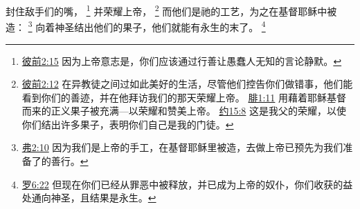 \documentclass[12pt, a4paper, oneside]{ctexart}
\begin{document}
	封住敌手们的嘴，
	\footnote {
		\href{https://biblehub.com/1_peter/2-15.htm}{彼前2:15} 因为上帝意志是，你们应该通过行善让愚蠢人无知的言论静默。
	}
	并荣耀上帝，
	\footnote {
		\href{https://biblehub.com/1_peter/2-12.htm}{彼前2:12} 在异教徒之间过如此美好的生活，尽管他们控告你们做错事，他们能看到你们的善迹，并在他拜访我们的那天荣耀上帝。
		\href{https://biblehub.com/philippians/1-11.htm}{腓1:11} 用藉着耶稣基督而来的正义果子被充满---以荣耀和赞美上帝。
		\href{https://biblehub.com/john/15-8.htm}{约15:8} 这是我父的荣耀，以使你们结出许多果子，表明你们自己是我的门徒。
	}
	而他们是祂的工艺，为之在基督耶稣中被造：
	\footnote {
		\href{https://biblehub.com/ephesians/2-10.htm}{弗2:10} 因为我们是上帝的手工，在基督耶稣里被造，去做上帝已预先为我们准备了的善行。
	}
	向着神圣结出他们的果子，他们就能有永生的末了。
	\footnote {
		\href{https://biblehub.com/romans/6-22.htm}{罗6:22} 但现在你们已经从罪恶中被释放，并已成为上帝的奴仆，你们收获的益处通向神圣，且结果是永生。
	}
\end{document}
